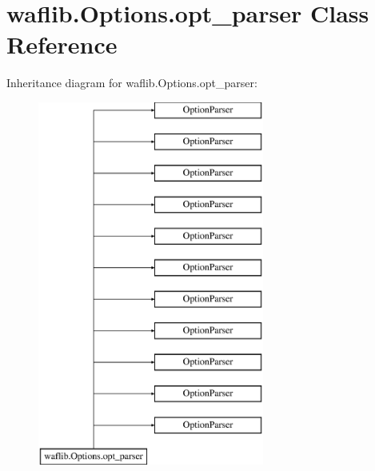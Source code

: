 \hypertarget{classwaflib_1_1_options_1_1opt__parser}{}\section{waflib.\+Options.\+opt\+\_\+parser Class Reference}
\label{classwaflib_1_1_options_1_1opt__parser}
Inheritance diagram for waflib.\+Options.\+opt\+\_\+parser\+:\begin{figure}[H]
\begin{center}
\leavevmode
\includegraphics[height=12.000000cm]{classwaflib_1_1_options_1_1opt__parser}
\end{center}
\end{figure}
